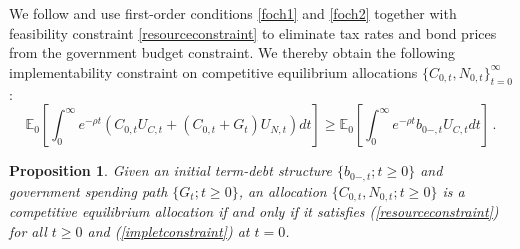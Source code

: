 \documentclass[12pt]{article}
\newtheorem{definition}{Definition}
\newtheorem{proposition}{Proposition}
\newcommand{\WJ}[1]{{\textcolor{red}{#1}}}
\newcommand{\TS}[1]{{\textcolor{magenta}{#1}}}
\begin{document}
We follow \cite{LucasStokey1983} and use first-order conditions  \eqref{foch1} and  \eqref{foch2} together with  feasibility constraint \eqref{resourceconstraint} to eliminate tax rates and bond prices from the
government budget constraint. We thereby obtain the following implementability constraint on competitive equilibrium allocations $\{C_{0,t},  N_{0,t}\}_{t=0}^\infty$: %
\begin{equation} %
	\mathbb{E}_0  \left[\int_{0}^{\infty} e^{-\rho t} ( C_{0, t}U_{C, t}+(C_{0, t}+G_t)U_{N, t} )  dt\right]  \geq \mathbb{E}_0 \left[ \int_{0}^{\infty}  e^{-\rho t} b_{0-, t} U_{C, t} dt \right]  \, .  \label{impletconstraint}
\end{equation}







\begin{proposition}\label{propo::1}
	Given an initial  term-debt  structure  $\{b_{0-, t}; t\geq 0\}$ and government spending path $\{G_t;t\geq 0\}$, an allocation $\{C_{0, t}, N_{0, t}; t\geq 0\}$ is a competitive equilibrium allocation if and only if it satisfies (\ref{resourceconstraint}) for all $t\geq 0$ and (\ref{impletconstraint}) at $t=0$. 
\end{proposition} %
%
%
%
%
%
\end{document}
